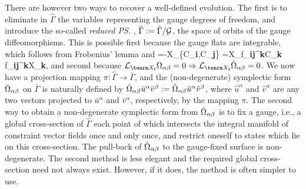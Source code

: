 There are however two ways to recover a well-defined evolution. The first
is to eliminate in $\hat\Gamma$ the variables representing the gauge
degrees of freedom, and introduce the so-called {\it reduced \ps},
$\bar\Gamma:=\hat\Gamma/{\cal G}$, the space of orbits of the gauge
diffeomorphisms.
This is possible first because the gauge flats are integrable, which
follows from Frobenius' lemma and
\bneq
   [X_{{\bf i}},X_{{\bf j}}]=-X_{\{C_{{\bf i}},C_{{\bf j}}\}}
   =X_{f_{{\bf ij}}{}^{\bf k}C_{\bf k}}
   \approx f_{{\bf ij}}{}^{\bf k}X_{\bf k},
and second because $\Lie{X_{\bf i}}\Omega_\ab = 0\implies \Lie{X_{\bf
i}}\hat\Omega_\ab = 0$. We now have a projection mapping
$\pi:\hat\Gamma\to\bar\Gamma$, and the (non-degenerate) symplectic form
$\bar\Omega_{\alpha\beta}$ on $\bar\Gamma$ is naturally defined by $\bar\Omega_{\alpha\beta}\bar
u^\alpha\bar v^\beta:= \hat\Omega_{\alpha\beta}\hat u^\alpha\hat v^\beta$, where $\hat
u^\alpha$ and $\hat v^\alpha$ are any two vectors projected to $\bar u^\alpha$
and $\bar v^\alpha$, respectively, by the mapping $\pi$. The second way to
obtain a non-degenerate symplectic form from $\hat\Omega_{\alpha\beta}$ is to fix a
gauge, i.e., a global cross-section of $\hat\Gamma$ each point of which
intersects the integral manifold of constraint vector fields once and only
once, and restrict oneself to states which lie on this cross-section. The
pull-back of $\hat\Omega_{\alpha\beta}$ to the gauge-fixed surface is non-degenerate.
The second method is less elegant and the required global cross-section
need not always exist. However, if it does, the method is often simpler to
use.

